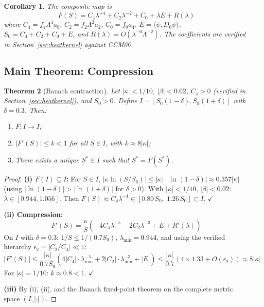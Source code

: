 \documentclass[11pt,a4paper]{article}
\newtheorem{theorem}{Theorem}[section]
\newtheorem{corollary}[theorem]{Corollary}
\theoremstyle{remark}
\begin{document}
\begin{corollary}
\label{cor:F}
The composite map is
\[
  F(S) = C_4 \lambda^{-4} + C_2 \lambda^{-2} + C_0 + \lambda E + R(\lambda)
\]
where $C_4 = f_4\Lambda^4 a_0$, $C_2 = f_2\Lambda^2 a_2$, $C_0 = f_0 a_4$, $E = \langle\psi, D_0\psi\rangle$, $S_0 = C_4 + C_2 + C_0 + E$, and $R(\lambda) = O(\lambda^{-6}\Lambda^{-2})$. The coefficients are verified in Section~\ref{sec:heatkernel} against CCM06.
\end{corollary}

\subsection{Main Theorem: Compression}

\begin{theorem}[Banach contraction]
\label{thm:contraction}
Let $|\kappa| < 1/10$, $|\beta| < 0.02$, $C_4 > 0$ (verified in Section~\ref{sec:heatkernel}), and $S_0 > 0$. Define $I = [S_0(1-\delta), S_0(1+\delta)]$ with $\delta = 0.3$. Then:
\begin{enumerate}
  \item $F: I \to I$;
  \item $|F'(S)| \leq k < 1$ for all $S \in I$, with $k \approx 8|\kappa|$;
  \item There exists a unique $S^* \in I$ such that $S^* = F(S^*)$.
\end{enumerate}
\end{theorem}

\begin{proof}
\textbf{(i) $F(I) \subseteq I$:} For $S \in I$, $|\kappa \ln(S/S_0)| \leq |\kappa| \cdot |\ln(1-\delta)| \approx 0.357|\kappa|$ (using $|\ln(1-\delta)| > |\ln(1+\delta)|$ for $\delta > 0$). With $|\kappa| < 1/10$, $|\beta| < 0.02$: $\lambda \in [0.944, 1.056]$. Then $F(S) \approx C_4 \lambda^{-4} \in [0.80\, S_0,\; 1.26\, S_0] \subset I$. $\checkmark$

\textbf{(ii) Compression:}
\[
  F'(S) = \frac{\kappa}{S}\left(-4C_4\lambda^{-5} - 2C_2\lambda^{-3} + E + R'(\lambda)\right)
\]
On $I$ with $\delta = 0.3$: $1/S \leq 1/(0.7 S_0)$, $\lambda_{\min} = 0.944$, and using the verified hierarchy $\epsilon_2 = |C_2/C_4| \ll 1$:
\[
  |F'(S)| \leq \frac{|\kappa|}{0.7 S_0}\left(4|C_4| \cdot \lambda_{\min}^{-5} + 2|C_2| \cdot \lambda_{\min}^{-3} + |E|\right) \leq \frac{|\kappa|}{0.7}\left(4 \times 1.33 + O(\epsilon_2)\right) \approx 8|\kappa|
\]
For $|\kappa| = 1/10$: $k \approx 0.8 < 1$. $\checkmark$

\textbf{(iii)} By (i), (ii), and the Banach fixed-point theorem on the complete metric space $(I, |\cdot|)$.
\end{proof}
\end{document}
